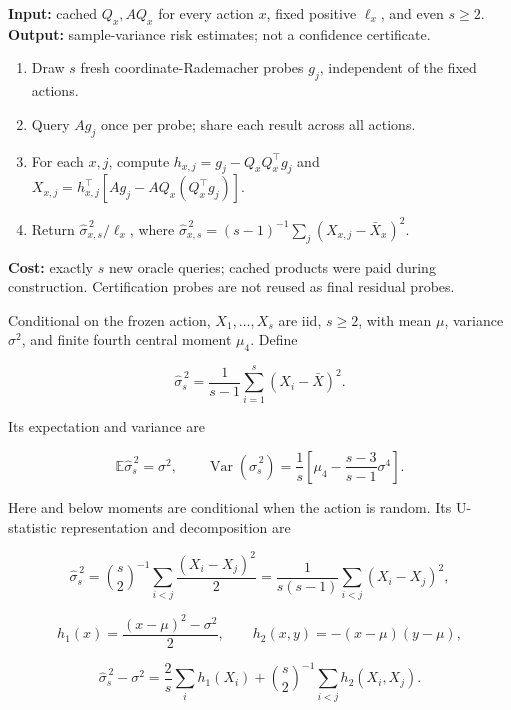 \begin{algorithm}
\caption{Common-probe risk diagnostic for preconstructed actions}\label{alg:diagnostic}
\textbf{Input:} cached $Q_x,AQ_x$ for every action $x$, fixed positive $\ell_x$, and even $s\ge2$.\\
\textbf{Output:} sample-variance risk estimates; not a confidence certificate.
\begin{enumerate}
\item Draw $s$ fresh coordinate-Rademacher probes $g_j$, independent of the fixed actions.
\item Query $Ag_j$ once per probe; share each result across all actions.
\item For each $x,j$, compute $h_{x,j}=g_j-Q_xQ_x^\top g_j$ and
$X_{x,j}=h_{x,j}^\top[Ag_j-AQ_x(Q_x^\top g_j)]$.
\item Return $\widehat\sigma_{x,s}^{\,2}/\ell_x$, where
$\widehat\sigma_{x,s}^{\,2}=(s-1)^{-1}\sum_j(X_{x,j}-\bar X_x)^2$.
\end{enumerate}
\textbf{Cost:} exactly $s$ new oracle queries; cached products were paid during construction.
Certification probes are not reused as final residual probes.
\end{algorithm}
\begin{lemma}\label{thm:T7}
Conditional on the frozen action, $X_1,\ldots,X_s$ are iid, $s\ge2$, with mean $\mu$, variance $\sigma^2$, and finite fourth central moment $\mu_4$. Define


\begin{equation}
\widehat\sigma_s^{\,2}=\frac1{s-1}\sum_{i=1}^s(X_i-\bar X)^2.
\end{equation}


Its expectation and variance are


\begin{equation}
\mathbb E\widehat\sigma_s^{\,2}=\sigma^2,\qquad
\operatorname{Var}(\widehat\sigma_s^{\,2})
=\frac1s\left[\mu_4-\frac{s-3}{s-1}\sigma^4\right].
\end{equation}


Here and below moments are conditional when the action is random. Its U-statistic representation and decomposition are


\begin{equation}
\widehat\sigma_s^{\,2}=\binom{s}{2}^{-1}\sum_{i<j}\frac{(X_i-X_j)^2}{2}
=\frac1{s(s-1)}\sum_{i<j}(X_i-X_j)^2,
\end{equation}


\begin{equation}
h_1(x)=\frac{(x-\mu)^2-\sigma^2}{2},\qquad
h_2(x,y)=-(x-\mu)(y-\mu),
\end{equation}


\begin{equation}
\widehat\sigma_s^{\,2}-\sigma^2
=\frac2s\sum_i h_1(X_i)+\binom{s}{2}^{-1}\sum_{i<j}h_2(X_i,X_j).
\end{equation}


\end{lemma}
